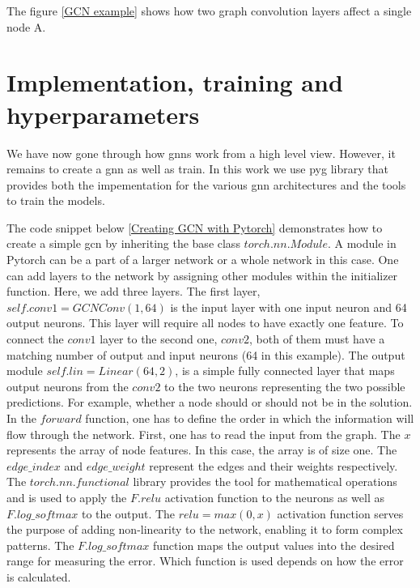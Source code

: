  The figure \ref{GCN example} shows how two graph convolution layers affect a single node A.

\section{Implementation, training and hyperparameters}
\label{sec:implementation}

We have now gone through how \gls{gnn}s work from a high level view. However, it remains to create a \gls{gnn} as well as train. In this work we use \gls{pyg} library \cite{pytorchlib} that provides both the impementation for the various \gls{gnn} architectures and the tools to train the models. 

The code snippet below \ref{Creating GCN with Pytorch} demonstrates how to create a simple \gls{gcn} by inheriting the base class $torch.nn.Module$. A module in Pytorch can be a part of a larger network or a whole network in this case. One can add layers to the network by assigning other modules within the initializer function. Here, we add three layers. The first layer, $self.conv1 = GCNConv(1,64)$ is the input layer with one input neuron and 64 output neurons. This layer will require all nodes to have exactly one feature. To connect the $conv1$ layer to the second one, $conv2$, both of them must have a matching number of output and input neurons (64 in this example). The output module $self.lin = Linear(64, 2)$, is a simple fully connected layer that maps output neurons from the $conv2$ to the two neurons representing the two possible predictions. For example, whether a node should or should not be in the solution. In the $forward$ function, one has to define the order in which the information will flow through the network. First, one has to read the input from the graph. The $x$ represents the array of node features. In this case, the array is of size one. The $edge\_index$ and $edge\_weight$ represent the edges and their weights respectively. The $torch.nn.functional$ library provides the tool for mathematical operations and is used to apply the $F.relu$ activation function to the neurons as well as $F.log\_softmax$ to the output. The $relu = max(0,x)$ activation function serves the purpose of adding non-linearity to the network, enabling it to form complex patterns. The $F.log\_softmax$ function maps the output values into the desired range for measuring the error. Which function is used depends on how the error is calculated.

